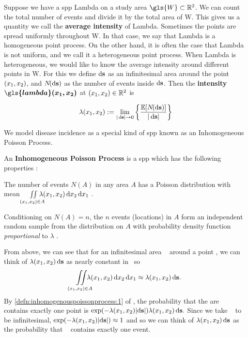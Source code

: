 Suppose we have a \gls{spp} \gls{Lambda} on a study area $\gls{W} \subset \RS$.
We can count the total number of \glspl{event} and divide it by the total area of \gls{W}.
This gives us a quantity we call the \textbf{average \gls{intensity}} of \gls{Lambda}.
Sometimes the points are spread uniformly throughout \gls{W}.
In that case, we say that \gls{Lambda} is a homogeneous point process.
On the other hand, it is often the case that \gls{Lambda} is not uniform,
and we call it a heterogeneous point process.
When \gls{Lambda} is heterogeneous,
we would like to know the average \gls{intensity} around different points in \gls{W}.
For this
we define $\mathop{}\!\mathrm{d}{\mathbf{s}}$ as an infinitesimal area around the point $(x_1, x_2)$,
and $N\!(\mathop{}\!\mathrm{d}{\mathbf{s}})$ as the number of \glspl{event} inside $\mathop{}\!\mathrm{d}{\mathbf{s}}$.
Then the \textbf{\gls{intensity}} $\boldsymbol{\gls{lambda}\xvec}$ at $(x_1, x_2) \in \mathbb{R}^2$ is

\begin{equation}
    \label{eq:lambda_differential}
    \lambda \xvec := \lim_{|\ds| \to 0}
        \left\{
            \frac{\mathbb{E}[N\!(\ds)]}%
            {|\ds|}
        \right\}
\end{equation}

We model disease incidence as a special kind of \gls{spp} known as an Inhomogeneous Poisson Process.
\begin{defn}
    \label{defn:inhomogenouspoissonprocess}
    An \textbf{Inhomogeneous Poisson Process} is a \gls{spp} which has the following properties \citep[Section 6.4]{diggle2014statistical}:
    \begin{properties}
        \item The number of events $N\!(A)$ in any area $A$ has a Poisson distribution with mean
            $\iint\limits_{(x_1, x_2) \in A}{\hspace{-1em} \lambda (x_1, x_2) \mathop{}\!\mathrm{d}{x_2} \mathop{}\!\mathrm{d}{x_1}}$
            \label{defn:inhomogenouspoissonprocess:1}.
        \item Conditioning on $N\!(A) \! = \! n$,
            the $n$ events (locations) in $A$ form an independent random sample from the distribution on $A$ with probability density function \textit{proportional} to $\lambda$ \label{defn:inhomogenouspoissonprocess:2}.
    \end{properties}
\end{defn}

From above, we can see that for an infinitesimal area \ds~ around a point \xvec,
we can think of $\lambda (x_1, x_2) \mathop{}\!\mathrm{d}{\mathbf{s}}$ as nearly constant in \ds~so
$$\iint\limits_{(x_1, x_2) \in A}{\hspace{-1em}\lambda (x_1, x_2) \mathop{}\!\mathrm{d}{x_2} \mathop{}\!\mathrm{d}{x_1}} \approx \lambda (x_1, x_2) \mathop{}\!\mathrm{d}{\mathbf{s}} \text{.}$$
By \cref{defn:inhomogenouspoissonprocess:1} of ,
the probability that the are \ds~ contains exactly one point is
$\exp(-\lambda (x_1, x_2) |\!\mathop{}\!\mathrm{d}{\mathbf{s}}|) \lambda (x_1, x_2) \mathop{}\!\mathrm{d}{\mathbf{s}} \text{.}$
Since we take \ds~ to be infinitesimal,
$\exp(-\lambda (x_1, x_2) |\!\mathop{}\!\mathrm{d}{\mathbf{s}}|) \allowbreak \approx 1$ and so we can think of
$\lambda (x_1, x_2) \mathop{}\!\mathrm{d}{\mathbf{s}}$ as the probability that \ds~ contains exactly one event.

